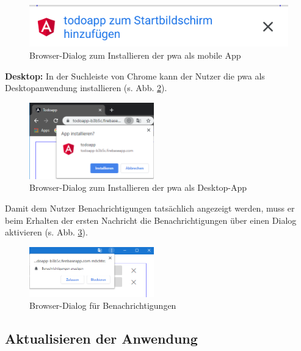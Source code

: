 \begin{figure}[h!]
	\includegraphics[scale=0.5]{img/pwa_add_to_homescreen.png}
	\centering
	\caption{Browser-Dialog zum Installieren der \ac{pwa} als mobile App}
	\label{fig:dialog_install_pwa_mobile}
\end{figure}

\textbf{Desktop:}
In der Suchleiste von Chrome kann der Nutzer die \ac{pwa} als Desktopanwendung installieren (s. Abb. \ref{fig:dialog_install_pwa_desktop}).
\begin{figure}[h!]
	\centering
	\includegraphics[width=0.48\textwidth]{img/add_to_desktop_2.PNG}
	\caption{Browser-Dialog zum Installieren der \ac{pwa} als Desktop-App}
	\label{fig:dialog_install_pwa_desktop}
\end{figure}

Damit dem Nutzer Benachrichtigungen tatsächlich angezeigt werden, muss er beim Erhalten der ersten Nachricht die Benachrichtigungen über einen Dialog aktivieren (s. Abb. \ref{fig:pwa_benachrichtigungen_zulassen}).
\begin{figure}[h!]	
	\includegraphics[width=0.48\textwidth]{img/berechtigungen_zulassen.PNG}
	\centering
	\caption{Browser-Dialog für Benachrichtigungen}
	\label{fig:pwa_benachrichtigungen_zulassen}
\end{figure}

\subsection{Aktualisieren der Anwendung}

